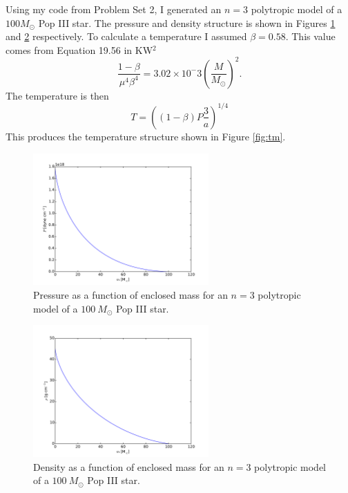 \documentclass[12pt]{paper}
\begin{document}
Using my code from Problem Set 2, I generated an $n=3$ polytropic model of a $100M_\odot$ Pop III star. The pressure and density structure is shown in Figures \ref{fig:pm} and \ref{fig:dm} respectively. To calculate a temperature I assumed $\beta=0.58$. This value comes from Equation 19.56 in KW$^2$ 
\begin{equation}\label{eq:beta}
\frac{1-\beta}{\mu^4\beta^4}=3.02\times10^-3\left(\frac{M}{M_\odot}\right)^2.
\end{equation}
The temperature is then 
\begin{equation}\label{eq:temp}
T=\left((1-\beta)P\frac{3}{a}\right)^{1/4}
\end{equation}
This produces the temperature structure shown in Figure \ref{fig:tm}.

\begin{figure}
\begin{center}
    \includegraphics[width=0.6\textwidth]{pressure3p0.pdf}
    \caption{Pressure as a function of enclosed mass for an $n=3$ polytropic model of a $100~M_\odot$ Pop III star.}
    \label{fig:pm}
\end{center}
\end{figure}

\begin{figure}
\begin{center}
    \includegraphics[width=0.6\textwidth]{density3p0.pdf}
    \caption{Density as a function of enclosed mass for an $n=3$ polytropic model of a $100~M_\odot$ Pop III star.}
    \label{fig:dm}
\end{center}
\end{figure}
\end{document}
